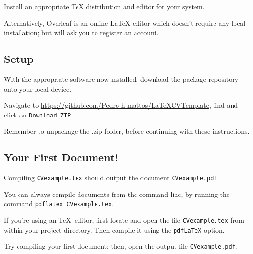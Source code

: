 \begin{instrct}
Install an appropriate TeX distribution and editor for your system. \par
\end{instrct}

Alternatively, Overleaf is an online LaTeX editor which doesn't require any local installation; but will ask you to register an account. \par

\subsection{Setup}
With the appropriate software now installed, download the package repository onto your local device. \par

\begin{instrct}
Navigate to \url{https://github.com/Pedro-h-mattos/LaTeXCVTemplate}, find and click on \lstinline|Download ZIP|.
\end{instrct}

Remember to unpackage the .zip folder, before continuing with these instructions. \par

\subsection{Your First Document!}
Compiling \lstinline|CVexample.tex| should output the document \lstinline|CVexample.pdf|. \par

You can always compile documents from the command line, by running the command \lstinline|pdflatex CVexample.tex|. \par

If you're using an \TeX~editor, first locate and open the file \lstinline|CVexample.tex| from within your project directory. Then compile it using the \lstinline|pdfLaTeX| option. \par

\begin{instrct}
Try compiling your first document; then, open the output file \lstinline|CVexample.pdf|.
\end{instrct}

